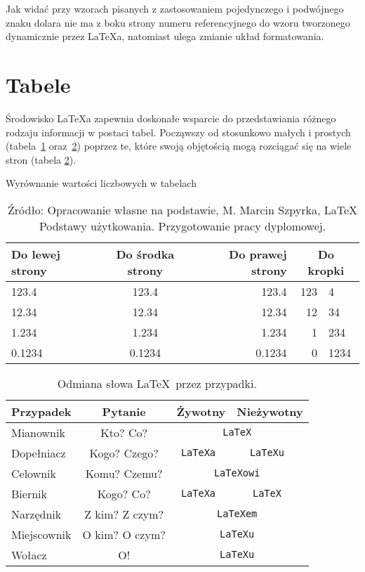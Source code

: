Jak widać przy wzorach pisanych z zastosowaniem pojedynczego i podwójnego znaku dolara nie ma z boku strony numeru referencyjnego do wzoru tworzonego dynamicznie przez \LaTeX{}a, natomiast ulega zmianie układ formatowania.

\section{Tabele}
\label{sec:tabele}
Środowisko \LaTeX{}a zapewnia doskonałe wsparcie do przedstawiania różnego rodzaju informacji w postaci tabel. Począwszy od stosunkowo małych i prostych (tabela~\ref{tab:wyrownanie_wartosci_liczbowych} oraz~\ref{tab:odmiana_slowa_latex}) poprzez te, które swoją objętością mogą rozciągać się na wiele stron (tabela \ref{tab:odmiana_slowa_latex}).

\begin{table}[h]
\caption{Wyrównanie wartości liczbowych w tabelach}
\label{tab:wyrownanie_wartosci_liczbowych}
\centering
    \begin{tabular}{|l|c|r|r@{.}l|}
    \hline
    Do lewej strony & Do środka strony & Do prawej strony & \multicolumn{2}{c|}{Do kropki} \\
    \hline
    \hline
    123.4  & 123.4   & 123.4   & 123 & 4\\
    12.34  & 12.34   & 12.34   & 12 & 34\\
    1.234  & 1.234   & 1.234   & 1 & 234\\
    0.1234 & 0.1234  & 0.1234  & 0 & 1234\\
    \hline
    \end{tabular}
\caption*{Źródło: Opracowanie własne na podstawie, M. Marcin Szpyrka, LaTeX Podstawy użytkowania. Przygotowanie pracy dyplomowej.}
\end{table}


\begin{table}[h]
\caption{Odmiana słowa \LaTeX ~przez przypadki.}
\label{tab:odmiana_slowa_latex}
\centering
	\begin{tabular}{| l | c | c | c |} \hline
	\textbf{Przypadek} & \textbf{Pytanie} & \textbf{Żywotny} & \textbf{Nieżywotny} \\ \hline \hline
	Mianownik    & Kto? Co?        & \multicolumn{2}{c|}{ \tt{LaTeX} } \\ \hline
	Dopełniacz   & Kogo? Czego?    & \tt{LaTeXa}      & \tt{LaTeXu} \\ \hline
	Celownik     & Komu? Czemu?    & \multicolumn{2}{c|}{ \tt{LaTeXowi} } \\ \hline
	Biernik      & Kogo? Co?       & \tt{LaTeXa}      & \tt{LaTeX} \\ \hline
	Narzędnik    & Z kim? Z czym?  & \multicolumn{2}{c|}{ \tt{LaTeXem} } \\ \hline
	Miejscownik  & O kim? O czym?  & \multicolumn{2}{c|}{ \tt{LaTeXu} } \\ \hline
	Wołacz       & O!              & \multicolumn{2}{c|}{ \tt{LaTeXu} } \\ \hline
	\end{tabular}
\end{table}


